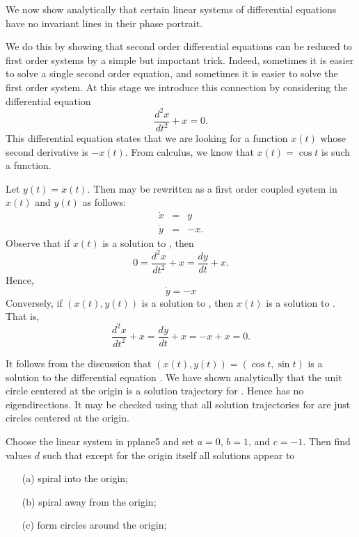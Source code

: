 \documentclass{ximera}
\begin{document}
We now show analytically that certain linear systems of
differential equations have no invariant lines in their phase portrait.

We do this by showing that second order differential equations can be
reduced to first order systems by a simple but important trick.  Indeed,
sometimes it is easier to solve a single second order equation, and
sometimes it is easier to solve the first order system.  At this stage
we introduce this connection by considering the differential equation
\begin{equation}  \label{E:2ndordera}
\frac{d^2x}{dt^2} + x = 0.
\end{equation}
This differential equation states that we are looking for a function
$x(t)$ whose second derivative is $-x(t)$.  From calculus, we know
that $x(t)=\cos t$ is such a function.

Let $y(t)=\dot{x}(t)$.  Then
 may be rewritten as a first order coupled system
in $x(t)$ and $y(t)$ as follows:
\begin{equation}  \label{E:2nd->1st}
\begin{array}{rcl}
\dot{x} & = & y \\
\dot{y} & = & -x.
\end{array}
\end{equation}
Observe that if $x(t)$ is a solution to , then
\[
0 = \frac{d^2x}{dt^2} + x = \frac{dy}{dt} + x.
\]
Hence,
\[
\dot{y} = -x
\]
Conversely, if $(x(t),y(t))$ is a solution to , then
$x(t)$ is a solution to .  That is,
\[
\frac{d^2x}{dt^2} + x = \frac{dy}{dt} + x = -x + x = 0.
\]

It follows from the discussion that $(x(t),y(t))=(\cos t,\sin t)$ is 
a solution to the differential equation .  We have shown 
analytically that the unit circle centered at the origin is a solution 
trajectory for .  Hence  has no 
eigendirections.  It may be checked using \Matlab that all solution 
trajectories for  are just circles centered at the origin.


\EXER

\CEXER

\begin{exercise} \label{c3.5.a01}
Choose the {\sf linear system} in {\sf pplane5} and set $a=0$, $b=1$, and 
$c=-1$.  Then find values $d$ such that except for the origin itself all 
solutions appear to
\begin{itemize}
\item[(a)] spiral into the origin;
\item[(b)] spiral away from the origin;
\item[(c)] form circles around the origin;
\end{itemize}
\end{exercise}
\end{document}
